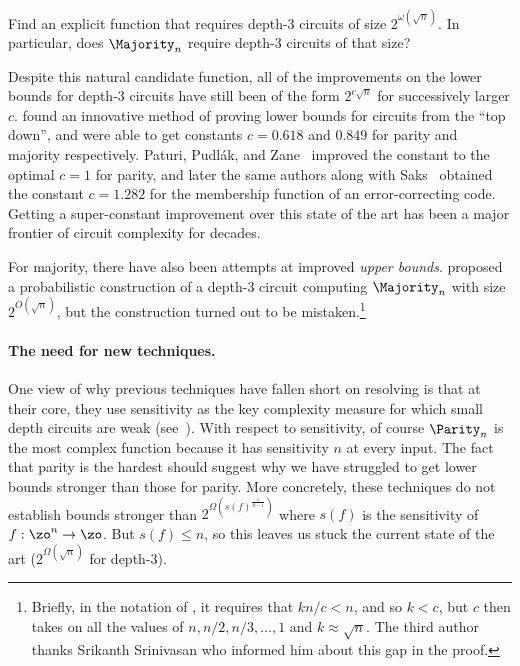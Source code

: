 \begin{openproblem}\label{op:depth3lbs}
Find an explicit function that requires depth-3 circuits of size $2^{\omega(\sqrt{n})}$.
In particular, does $\Majority_n$ require depth-3 circuits of that size?
\end{openproblem}

Despite this natural candidate function, all of the improvements on the lower bounds for \mbox{depth-3} circuits have still been of the form $2^{c\sqrt{n}}$ for successively larger $c$. \cite{HJP93} found an innovative method of proving lower bounds for circuits from the ``top down'', and were able to get constants $c = 0.618$ and $0.849$ for parity and majority respectively.
Paturi, Pudl{\'a}k, and Zane~\cite{PPZ97} improved the constant to the optimal $c=1$ for parity, and later
the same authors along with Saks~\cite{PPSZ05}
obtained the constant
$c = 1.282$ for the membership function of an error-correcting code.
Getting a super-constant improvement over this state of the art has been a major frontier of circuit complexity for decades. 

For majority, there have also been attempts at improved \emph{upper bounds}. \cite{Wol06} proposed a probabilistic construction of a depth-3 circuit computing $\Majority_n$ with size $2^{O(\sqrt{n})}$, but the construction turned out to be mistaken.\footnote{Briefly, in the notation of \cite{Wol06}, it requires that $kn/c < n$, and so $k < c$, but $c$ then takes on all the values of $n, n/2, n/3, \ldots, 1$ and $k \approx \sqrt{n}$. The third author thanks Srikanth Srinivasan \cite{Sri15} who informed him about this gap in the proof.}















\paragraph*{The need for new techniques.}  
One view of why previous techniques have fallen short on resolving  is that at their core, they use sensitivity as the key complexity measure  for which small depth circuits are weak (see~\cite{Bop97,Ros18,MW19}). With respect to sensitivity, of course $\Parity_n$ is the most complex function because it has sensitivity $n$ at every input.
The fact that parity is the hardest should suggest why we have struggled to get lower bounds stronger than those for parity.
More concretely, these techniques do not establish bounds stronger than $2^{\Omega(s(f)^{\frac{1}{d -1}})}$  where $s(f)$ is the sensitivity of $f:\zo^n\to\zo$. But $s(f)\leq n$, so this leaves us stuck the current state of the art ($2^{\Omega(\sqrt{n})}$ for depth-3).

